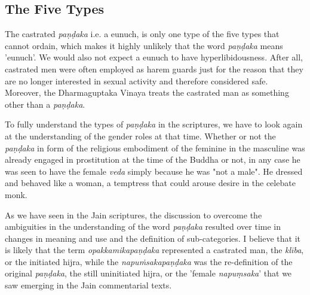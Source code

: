 \subsection{The Five Types}
The castrated {\em paṇḍaka} i.e. a eunuch, is only one type of the five types that cannot ordain, which makes it highly unlikely that the word {\em paṇḍaka} means 'eunuch'. We would also not expect a eunuch to have hyperlibidousness. After all, castrated men were often employed as harem guards just for the reason that they are no longer interested in sexual activity and therefore considered safe. Moreover, the Dharmaguptaka Vinaya treats the castrated man as something other than a {\em paṇḍaka}.

To fully understand the types of {\em paṇḍaka} in the scriptures, we have to look again at the understanding of the gender roles at that time. Whether or not the {\em paṇḍaka} in form of the religious embodiment of the feminine in the masculine was already engaged in prostitution at the time of the Buddha or not, in any case he was seen to have the female {\em veda} simply because he was "not a male". He dressed and behaved like a woman, a temptress that could arouse desire in the celebate monk. 

As we have seen in the Jain scriptures, the discussion to overcome the ambiguities in the understanding of the word {\em paṇḍaka} resulted over time in changes in meaning and use and the definition of sub-categories. I believe that it is likely that the term {\em opakkamikapaṇḍaka} represented a castrated man, the {\em klība}, or the initiated hijra, while the {\em napuṁsakapaṇḍaka} was the re-definition of the original {\em paṇḍaka}, the still uninitiated hijra, or the 'female {\em napuṃsaka}' that we saw emerging in the Jain commentarial texts.

